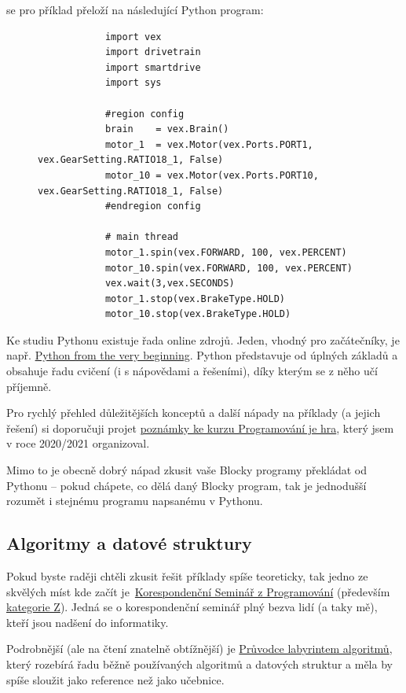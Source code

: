 \documentclass[../main.tex]{subfiles}
\begin{document}
	se pro příklad přeloží na následující Python program:

	\begin{figure}[h!]
		\centering
		\begin{verbatim}
			import vex
			import drivetrain
			import smartdrive
			import sys

			#region config
			brain    = vex.Brain()
			motor_1  = vex.Motor(vex.Ports.PORT1, vex.GearSetting.RATIO18_1, False)
			motor_10 = vex.Motor(vex.Ports.PORT10, vex.GearSetting.RATIO18_1, False)
			#endregion config

			# main thread
			motor_1.spin(vex.FORWARD, 100, vex.PERCENT)
			motor_10.spin(vex.FORWARD, 100, vex.PERCENT)
			vex.wait(3,vex.SECONDS)
			motor_1.stop(vex.BrakeType.HOLD)
			motor_10.stop(vex.BrakeType.HOLD)
		\end{verbatim}
	\end{figure}

	Ke studiu Pythonu existuje řada online zdrojů. Jeden, vhodný pro začátečníky, je např. \href{https://coherentpdf.com/python/pythonfromtheverybeginning.html}{Python from the very beginning}. Python představuje od úplných základů a obsahuje řadu cvičení (i s nápovědami a řešeními), díky kterým se z něho učí příjemně.

	Pro rychlý přehled důležitějších konceptů a další nápady na příklady (a jejich řešení) si doporučuji projet \href{https://slama.dev/programovani-je-hra/}{poznámky ke kurzu Programování je hra}, který jsem v roce 2020/2021 organizoval.

	Mimo to je obecně dobrý nápad zkusit vaše Blocky programy překládat od Pythonu -- pokud chápete, co dělá daný Blocky program, tak je jednodušší rozumět i stejnému programu napsanému v Pythonu.

	\subsection{Algoritmy a datové struktury}
	Pokud byste raději chtěli zkusit řešit příklady spíše teoreticky, tak jedno ze skvělých míst kde začít je~\href{http://ksp.mff.cuni.cz/}{\mbox{Korespondenční} Seminář z Programování} (především \href{http://ksp.mff.cuni.cz/z/}{kategorie Z}). Jedná se o korespondenční seminář plný bezva lidí (a taky mě), kteří jsou nadšení do informatiky.

	Podrobnější (ale na čtení znatelně obtížnější) je \href{http://pruvodce.ucw.cz/}{Průvodce labyrintem algoritmů}, který rozebírá řadu běžně používaných algoritmů a datových struktur a měla by spíše sloužit jako reference než jako učebnice.
\end{document}
